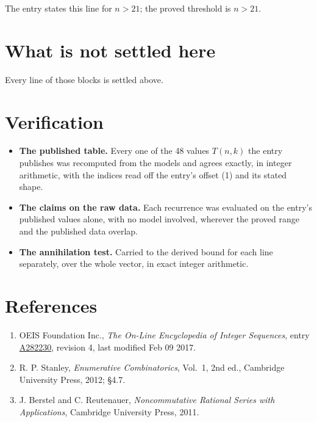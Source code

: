 \documentclass[11pt]{article}
\theoremstyle{definition}
\begin{document}
The entry states this line for $n > 21$; the proved threshold is $n > 21$.

\section{What is not settled here}

Every line of those blocks is settled above.

\section{Verification}

\begin{itemize}

\item {\bfseries The published table.} Every one of the 48 values $T(n,k)$ the entry publishes was recomputed from the models and agrees exactly, in integer arithmetic, with the indices read off the entry's offset (1) and its stated shape.

\item {\bfseries The claims on the raw data.} Each recurrence was evaluated on the entry's published values alone, with no model involved, wherever the proved range and the published data overlap.

\item {\bfseries The annihilation test.} Carried to the derived bound for each line separately, over the whole vector, in exact integer arithmetic.

\end{itemize}

\section{References}

\begin{enumerate}

\item OEIS Foundation Inc., \emph{The On-Line Encyclopedia of Integer Sequences}, entry \href{https://oeis.org/A282230}{A282230}, revision 4, last modified Feb 09 2017.

\item R. P. Stanley, \emph{Enumerative Combinatorics}, Vol.~1, 2nd ed., Cambridge University Press, 2012; \S4.7.

\item J. Berstel and C. Reutenauer, \emph{Noncommutative Rational Series with Applications}, Cambridge University Press, 2011.

\end{enumerate}
\end{document}
